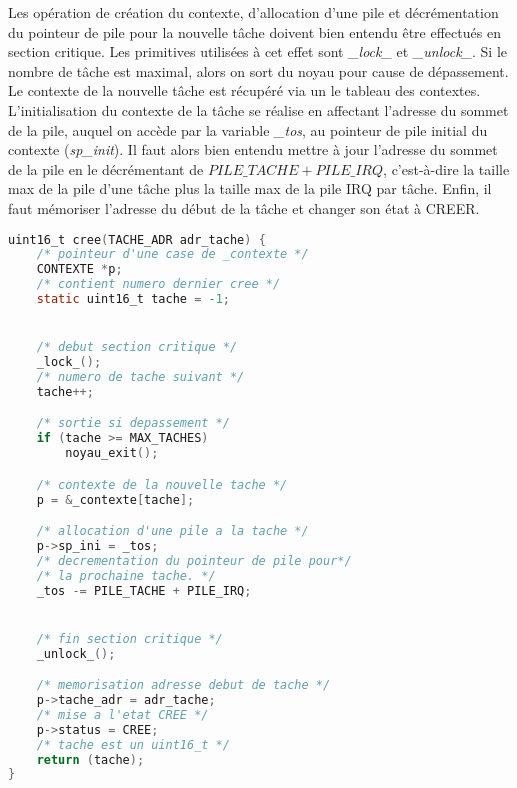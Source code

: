 \documentclass{article}
\begin{document}
Les opération de création du contexte, d'allocation d'une pile et décrémentation du pointeur de pile pour la nouvelle tâche doivent bien entendu être effectués en section critique. Les primitives utilisées à cet effet sont \textit{\_lock\_} et \textit{\_unlock\_}. Si le nombre de tâche est maximal, alors on sort du noyau pour cause de dépassement. Le contexte de la nouvelle tâche est récupéré via un le tableau des contextes. L'initialisation du contexte de la tâche se réalise en affectant l'adresse du sommet de la pile, auquel on accède par la variable \textit{\_tos}, au pointeur de pile initial du contexte (\textit{sp\_init}). Il faut alors bien entendu mettre à jour l'adresse du sommet de la pile en le décrémentant de $PILE\_TACHE + PILE\_IRQ$, c'est-à-dire la taille max de la pile d'une tâche plus la taille max de la pile IRQ par tâche.
Enfin, il faut mémoriser l'adresse du début de la tâche et changer son état à CREER.
\begin{lstlisting}[language=C, caption=noyau.c]
uint16_t cree(TACHE_ADR adr_tache) {
    /* pointeur d'une case de _contexte */
    CONTEXTE *p;
    /* contient numero dernier cree */
    static uint16_t tache = -1;


    /* debut section critique */
    _lock_();
    /* numero de tache suivant */
    tache++;

    /* sortie si depassement */
    if (tache >= MAX_TACHES)
        noyau_exit();

    /* contexte de la nouvelle tache */
    p = &_contexte[tache];

    /* allocation d'une pile a la tache */
    p->sp_ini = _tos;
    /* decrementation du pointeur de pile pour*/
    /* la prochaine tache. */
    _tos -= PILE_TACHE + PILE_IRQ;


    /* fin section critique */
    _unlock_();

    /* memorisation adresse debut de tache */
    p->tache_adr = adr_tache;
    /* mise a l'etat CREE */
    p->status = CREE;
    /* tache est un uint16_t */
    return (tache);
}
\end{lstlisting}
\end{document}
